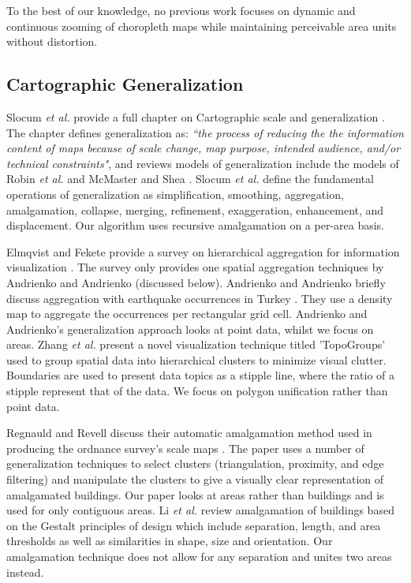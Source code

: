  To the best of our knowledge, no previous work focuses on dynamic and continuous zooming of choropleth maps while maintaining perceivable area units without distortion.
 
\subsection{Cartographic Generalization}
Slocum \textit{et al.} provide a full chapter on Cartographic scale and generalization \cite{slocum2009thematic}. The chapter defines generalization as: \textit{``the process of reducing the the information content of maps because of scale change, map purpose, intended audience, and/or technical constraints"}, and reviews models of generalization include the models of Robin \textit{et al.} \cite{robinson1978elements} and McMaster and Shea \cite{mcmaster1992generalization}. Slocum \textit{et al.} define the fundamental operations of generalization as simplification, smoothing, aggregation, amalgamation, collapse, merging, refinement, exaggeration, enhancement, and displacement. Our algorithm uses recursive amalgamation on a per-area basis.

Elmqvist and Fekete provide a survey on hierarchical aggregation for information visualization \cite{elmqvist2010hierarchical}. The survey only provides one spatial aggregation techniques by Andrienko and Andrienko (discussed below). Andrienko and Andrienko briefly discuss aggregation with earthquake occurrences in Turkey \cite{andrienko2006exploratory}. They use a density map to aggregate the occurrences per rectangular grid cell. Andrienko and Andrienko's generalization approach looks at point data, whilst we focus on areas. Zhang \textit{et al.} present a novel visualization technique titled 'TopoGroups' \cite{zhang2017topogroups} used to group spatial data into hierarchical clusters to minimize visual clutter. Boundaries are used to present data topics as a stipple line, where the ratio of a stipple represent that of the data. We focus on polygon unification rather than point data.

Regnauld and Revell discuss their automatic amalgamation method used in producing the ordnance survey's scale maps \cite{regnauld2007automatic}. The paper uses a number of generalization techniques to select clusters (triangulation, proximity, and edge filtering) and manipulate the clusters to give a visually clear representation of amalgamated buildings. Our paper looks at areas rather than buildings and is used for only contiguous areas. Li \textit{et al.} review amalgamation of buildings based on the Gestalt principles of design \cite{li2004automated} which include separation, length, and area thresholds as well as similarities in shape, size and orientation. Our amalgamation technique does not allow for any separation and unites two areas instead. 

